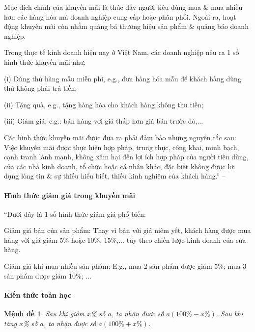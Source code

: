 \documentclass{article}
\numberwithin{equation}{section}
\newtheorem{menhde}{Mệnh đề}[section]
\begin{document}
Mục đích chính của khuyến mãi là thúc đẩy người tiêu dùng mua \& mua nhiều hơn các hàng hóa mà doanh nghiệp cung cấp hoặc phân phối. Ngoài ra, hoạt động khuyến mãi còn nhằm quảng bá thương hiệu sản phẩm \& quảng báo doanh nghiệp.

Trong thực tế kinh doanh hiện nay ở Việt Nam, các doanh nghiệp nêu ra 1 số hình thức khuyến mãi như:
\begin{enumerate*}
	\item[(i)] Dùng thử hàng mẫu miễn phí, e.g., đưa hàng hóa mẫu để khách hàng dùng thử không phải trả tiền;
	\item[(ii)] Tặng quà, e.g., tặng hàng hóa cho khách hàng không thu tiền;
	\item[(iii)] Giảm giá, e.g.: bán hàng với giá thấp hơn giá bán trước đó,$\ldots$
\end{enumerate*}
Các hình thức khuyến mãi được đưa ra phải đảm bảo những nguyên tắc sau: Việc khuyến mãi được thực hiện hợp pháp, trung thực, công khai, minh bạch, cạnh tranh lành mạnh, không xâm hại đến lợi ích hợp pháp của người tiêu dùng, của các nhà kinh doanh, tổ chức hoặc cá nhân khác, đặc biệt không được lợi dụng lòng tin \& sự thiếu hiểu biết, thiếu kinh nghiệm của khách hàng.'' -- \cite[p. 71]{SGK_Toan_7_Canh_Dieu_tap_1}

\paragraph{Hình thức giảm giá trong khuyến mãi}
``Dưới đây là 1 số hình thức giảm giá phổ biến:
\begin{enumerate*}
	\item Giảm giá bán của sản phẩm: Thay vì bán với giá niêm yết, khách hàng được mua hàng với giá giảm 5\% hoặc 10\%, 15\%,$\ldots$ tùy theo chiến lược kinh doanh của cửa hàng.
	\item Giảm giá khi mua nhiều sản phẩm: E.g., mua 2 sản phẩm được giảm 5\%; mua 3 sản phẩm được giảm 10\%; $\ldots$
\end{enumerate*}

\paragraph{Kiến thức toán học}

\begin{menhde}
	Sau khi giảm $x$\% số $a$, ta nhận được số $a(100\% - x\%)$. Sau khi tăng $x$\% số $a$, ta nhận được số $a(100\% + x\%)$.
\end{menhde}
\end{document}
